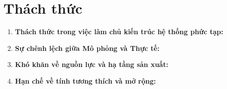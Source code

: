 \section{Thách thức}
    \begin{enumerate}
        \item \textbf{Thách thức trong việc làm chủ kiến trúc hệ thống phức tạp:}
        \item \textbf{Sự chênh lệch giữa Mô phỏng và Thực tế:}
        \item \textbf{Khó khăn về nguồn lực và hạ tầng sản xuất:}
        \item \textbf{Hạn chế về tính tương thích và mở rộng:}
        
    \end{enumerate}
